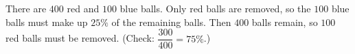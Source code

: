 There are $400$ red and $100$ blue balls. Only red balls are removed, so the $100$ blue balls must make up $25\%$ of the remaining balls. Then $400$ balls remain, so $\boxed{100}$ red balls must be removed. (Check: $\dfrac{300}{400}=75\%$.)
